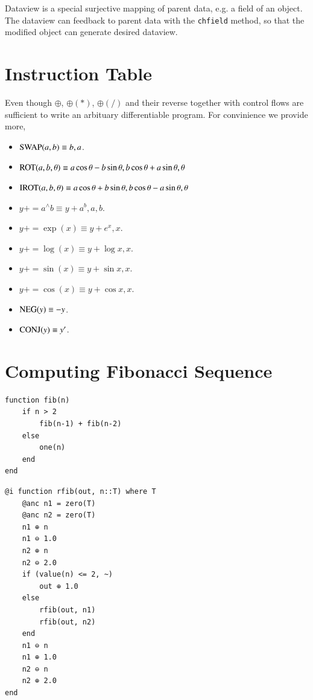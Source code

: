 \documentclass{article}
\newcommand{\<}{\langle}
\renewcommand{\>}{\rangle}
\begin{document}
Dataview is a special surjective mapping of parent data, e.g. a field of an object.
The dataview can feedback to parent data with the 
\texttt{chfield} method, so that the modified object can generate desired dataview.

\section{Instruction Table}\label{app:instr}
Even though \texttt{$\oplus$}, \texttt{$\oplus(*)$}, \texttt{$\oplus(/)$} and their reverse together with control flows are sufficient to write an arbituary differentiable program.
For convinience we provide more,
\begin{itemize}
    \item ${\rm SWAP}(a, b) \equiv b, a$.
    \item ${\rm ROT}(a, b, \theta) \equiv a \cos\theta - b\sin\theta, b \cos\theta + a\sin\theta, \theta$
    \item ${\rm IROT}(a, b, \theta) \equiv a \cos\theta + b\sin\theta, b \cos\theta - a\sin\theta, \theta$
    \item $y += a^\wedge b \equiv y+a^b, a, b$.
    \item $y += \exp(x) \equiv y+e^x, x$.
    \item $y += \log(x) \equiv y+\log x, x$.
    \item $y += \sin(x) \equiv y+\sin x, x$.
    \item $y += \cos(x) \equiv y+\cos x, x$.
    \item ${\rm NEG}(y) \equiv -y$.
    \item ${\rm CONJ}(y) \equiv y'$.
\end{itemize}

\section{Computing Fibonacci Sequence}\label{app:fib}
\begin{minipage}{.44\textwidth}
\begin{lstlisting}
function fib(n)
    if n > 2
        fib(n-1) + fib(n-2)
    else
        one(n)
    end
end
\end{lstlisting}
\end{minipage}

\begin{minipage}{.44\textwidth}
\begin{lstlisting}
@i function rfib(out, n::T) where T
    @anc n1 = zero(T)
    @anc n2 = zero(T)
    n1 ⊕ n
    n1 ⊖ 1.0
    n2 ⊕ n
    n2 ⊖ 2.0
    if (value(n) <= 2, ~)
        out ⊕ 1.0
    else
        rfib(out, n1)
        rfib(out, n2)
    end
    n1 ⊖ n
    n1 ⊕ 1.0
    n2 ⊖ n
    n2 ⊕ 2.0
end
\end{lstlisting}
\end{minipage}
\end{document}
